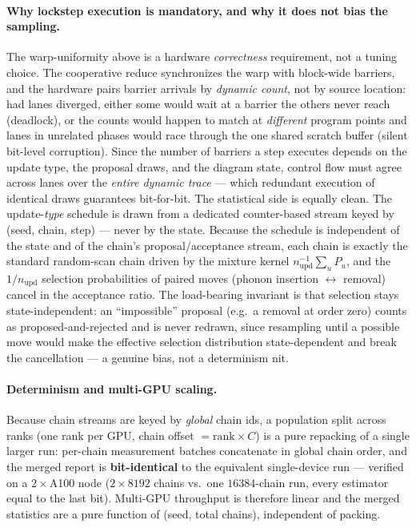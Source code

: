 \documentclass[11pt]{article}
\begin{document}
\paragraph{Why lockstep execution is mandatory, and why it does not bias the sampling.}
The warp-uniformity above is a hardware \emph{correctness} requirement, not a tuning
choice. The cooperative reduce synchronizes the warp with block-wide barriers, and the
hardware pairs barrier arrivals by \emph{dynamic count}, not by source location: had lanes
diverged, either some would wait at a barrier the others never reach (deadlock), or the
counts would happen to match at \emph{different} program points and lanes in unrelated
phases would race through the one shared scratch buffer (silent bit-level corruption).
Since the number of barriers a step executes depends on the update type, the proposal
draws, and the diagram state, control flow must agree across lanes over the \emph{entire
dynamic trace} --- which redundant execution of identical draws guarantees bit-for-bit.
The statistical side is equally clean. The update-\emph{type} schedule is drawn from a
dedicated counter-based stream keyed by (seed, chain, step) --- never by the state.
Because the schedule is independent of the state and of the chain's proposal/acceptance
stream, each chain is exactly the standard random-scan chain driven by the mixture kernel
$n_{\mathrm{upd}}^{-1}\sum_{u}P_{u}$, and the $1/n_{\mathrm{upd}}$ selection probabilities
of paired moves (phonon insertion $\leftrightarrow$ removal) cancel in the acceptance
ratio. The load-bearing invariant is that selection stays state-independent: an
``impossible'' proposal (e.g.\ a removal at order zero) counts as proposed-and-rejected and is never
redrawn, since resampling until a possible move would make the effective selection
distribution state-dependent and break the cancellation --- a genuine bias, not a
determinism nit.

\paragraph{Determinism and multi-GPU scaling.}
Because chain streams are keyed by \emph{global} chain ids, a population split across
ranks (one rank per GPU, chain offset $=\text{rank}\times C$) is a pure repacking of a
single larger run: per-chain measurement batches concatenate in global chain order, and
the merged report is \textbf{bit-identical} to the equivalent single-device run ---
verified on a $2\times$A100 node ($2\times8192$ chains vs.\ one $16384$-chain run, every
estimator equal to the last bit). Multi-GPU throughput is therefore linear and the merged
statistics are a pure function of (seed, total chains), independent of packing.
\end{document}
